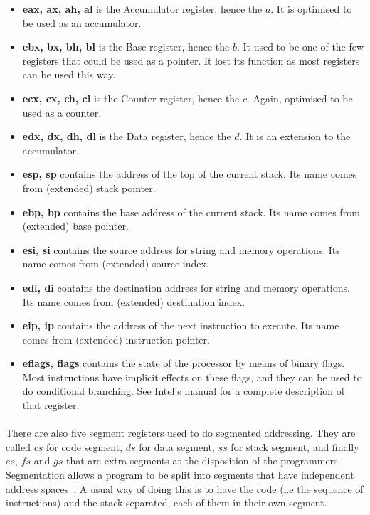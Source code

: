 \begin{itemize}
	\item \textbf{eax, ax, ah, al} is the Accumulator register, hence the $a$. It is optimised to be used as an accumulator.
	\item \textbf{ebx, bx, bh, bl} is the Base register, hence the $b$. It used to be one of the few registers that could be used as a pointer. It lost its function as most registers can be used this way.
	\item \textbf{ecx, cx, ch, cl} is the Counter register, hence the $c$. Again, optimised to be used as a counter.
	\item \textbf{edx, dx, dh, dl} is the Data register, hence the $d$. It is an extension to the accumulator.
	\item \textbf{esp, sp} contains the address of the top of the current stack. Its name comes from (extended) stack pointer.
	\item \textbf{ebp, bp} contains the base address of the current stack. Its name comes from (extended) base pointer.
	\item \textbf{esi, si} contains the source address for string and memory operations. Its name comes from (extended) source index.
	\item \textbf{edi, di} contains the destination address for string and memory operations. Its name comes from (extended) destination index.
	\item \textbf{eip, ip} contains the address of the next instruction to execute. Its name comes from (extended) instruction pointer.
	\item \textbf{eflags, flags} contains the state of the processor by means of binary flags. Most instructions have implicit effects on these flags, and they can be used to do conditional branching. See Intel's manual for a complete description of that register.
\end{itemize}

\paragraph{}
There are also five segment registers used to do segmented addressing. They are called $cs$ for code segment, $ds$ for data segment, $ss$ for stack segment, and finally $es$, $fs$ and $gs$ that are extra segments at the disposition of the programmers. Segmentation allows a program to be split into segments that have independent address spaces~\cite{guide2011intel}. A usual way of doing this is to have the code (i.e the sequence of instructions) and the stack separated, each of them in their own segment.

